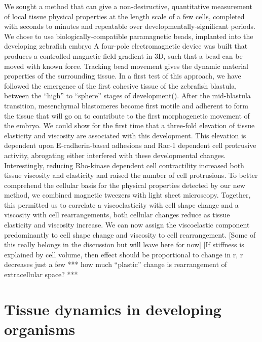 We sought a method that can give a non-destructive, quantitative measurement of local tissue physical properties at the length scale of a few cells, completed with seconds to minutes and repeatable over developmentally-significant periods.
We chose to use biologically-compatible paramagnetic beads, implanted into the developing zebrafish embryo
A four-pole electromagnetic device was built that produces a controlled magnetic field gradient in 3D, such that a bead can be moved with known force.
Tracking bead movement gives the dynamic material properties of the surrounding tissue.
In a first test of this approach, we have followed the emergence of the first cohesive tissue of the zebrafish blastula, between the “high” to “sphere” stages of development().
After the mid-blastula transition, mesenchymal blastomeres become first motile and adherent to form the tissue that will go on to contribute to the first morphogenetic movement of the embryo.
We could show for the first time that a three-fold elevation of tissue elasticity and viscosity are associated with this development.
This elevation is dependent upon E-cadherin-based adhesions and Rac-1 dependent cell protrusive activity, abrogating either interfered with these developmental changes.
Interestingly, reducing Rho-kinase dependent cell contractility increased both tissue viscosity and elasticity and raised the number of cell protrusions.
To better comprehend the cellular basis for the physical properties detected by our new method, we combined magnetic tweezers with light sheet microscopy.
Together, this permitted us to correlate a viscoelasticity with cell shape change and a viscosity with cell rearrangements, both cellular changes reduce as tissue elasticity and viscosity increase.
We can now assign the viscoelastic component predominantly to cell shape change and viscosity to cell rearrangement.
[Some of this really belongs in the discussion but will leave here for now]
[If stiffness is explained by cell volume, then effect should be proportional to change in r, r decreases just a few %
*** how much “plastic” change is rearrangement of extracellular space? ***

\section{Tissue dynamics in developing organisms}
